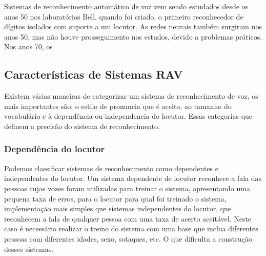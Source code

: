 Sistemas de reconhecimento automático de voz vem sendo estudados desde os anos 50 nos laboratórios Bell, quando foi criado, o primeiro reconhecedor de dígitos isolados com suporte a um locutor.\cite{Historico1} As redes neurais também surgiram nos anos 50, mas não houve prosseguimento nos estudos, devido a problemas práticos. Nos anos 70, 
os 

\subsection{Características de Sistemas RAV}\label{sec:red_neu}

Existem várias maneiras de categorizar um sistema de reconhecimento de voz, os mais importantes são: o estilo de pronuncia que é aceito, ao tamanho do vocabulário e à dependência ou independencia do locutor. \cite{Carac1} Essas categorias que definem a precisão do sistema de reconhecimento.

\subsubsection{Dependência do locutor}
Podemos classificar sistemas de reconhecimento como dependentes e independentes do locutor. Um sistema dependente de locutor reconhece a fala das pessoas cujas vozes foram utilizadas para treinar o sistema, apresentando uma pequena taxa de erros, para o locutor para qual foi treinado o sistema,  implementação mais simples que sistemas independentes do locutor, que reconhecem a fala de qualquer pessoa com uma taxa de acerto aceitável. Neste caso é necessário realizar o treino do sistema com uma base que inclua diferentes pessoas com diferentes idades, sexo, sotaques, etc. O que dificulta a construção desses sistemas.

